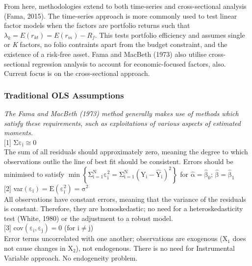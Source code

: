 \documentclass[11pt, english]{article}
\begin{document}
	From here, methodologies extend to both time-series and cross-sectional analysis (Fama, 2015). The time-series approach is more commonly used to test linear factor models when the factors are portfolio returns such that $\lambda_k=E(r_{kt})=E(r_m)-R_f$. This tests portfolio efficiency and assumes single or \textit{K} factors, no folio contraints apart from the budget constraint, and the existence of a risk-free asset. Fama and MacBeth (1973) also utilise cross-sectional regression analysis to account for economic-focused factors, also. Current focus is on the cross-sectional approach.

		\subsubsection*{Traditional OLS Assumptions}

	\textit{The Fama and MacBeth (1973) method generally makes use of methods which satisfy these requirements, such as exploitations of various aspects of estimated moments.}\\

        [1] $\mathrm{\Sigma\varepsilon_i\cong0}$\\

        The sum of all residuals should approximately zero, meaning the degree to which observations outlie the line of best fit should be consistent. Errors should be minimised to satisfy $\mathrm{\min\left\{\Sigma_{i=1}^N\varepsilon_i^2=\Sigma_{i=1}^N\left(Y_i-\hat{Y}_i\right)^2\right\}}$ for $\mathrm{\hat{\alpha}=\hat{\beta}_0}$; $\mathrm{\hat{\beta}=\hat{\beta}_1}$\\

        [2] var$\mathrm{(\varepsilon_i)=E(\varepsilon_i^2)=\sigma^2}$\\

        All observations have constant errors, meaning that the variance of the residuals is constant. Therefore, they are homoskedastic; no need for a heteroskedasticity test (White, 1980) or the adjustment to a robust model.\\

        [3] cov$\mathrm{(\varepsilon_i,\varepsilon_j)=0}$ (for $\mathrm{i\neq j}$)\\

        Error terms uncorrelated with one another; observations are exogenous (X$_1$ does not cause changes in X$_2$), not endogenous. There is no need for Instrumental Variable approach. No endogeneity problem.
\end{document}
